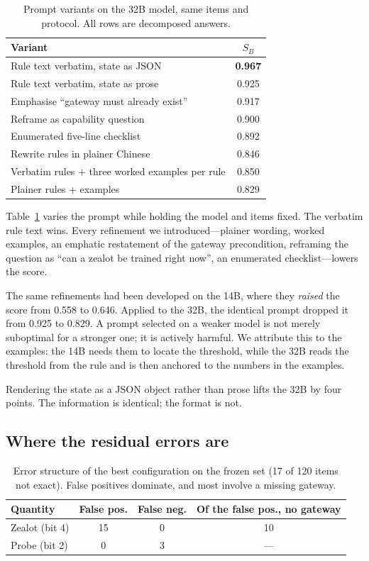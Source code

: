 \documentclass[journal]{IEEEtran}
\newcommand{\sB}{S_B}
\begin{document}
\begin{table}[t]
\centering
\caption{Prompt variants on the 32B model, same items and protocol. All rows are decomposed
answers.}
\label{tab:variants}
\footnotesize
\begin{tabular}{@{}lc@{}}
\toprule
Variant & $\sB$ \\
\midrule
Rule text verbatim, state as JSON & \textbf{0.967} \\
Rule text verbatim, state as prose & 0.925 \\
Emphasise ``gateway must already exist'' & 0.917 \\
Reframe as capability question & 0.900 \\
Enumerated five-line checklist & 0.892 \\
Rewrite rules in plainer Chinese & 0.846 \\
Verbatim rules + three worked examples per rule & 0.850 \\
Plainer rules + examples & 0.829 \\
\bottomrule
\end{tabular}
\end{table}

Table~\ref{tab:variants} varies the prompt while holding the model and items fixed. The
verbatim rule text wins. Every refinement we introduced---plainer wording, worked examples, an
emphatic restatement of the gateway precondition, reframing the question as ``can a zealot be
trained right now'', an enumerated checklist---lowers the score.

The same refinements had been developed on the 14B, where they \emph{raised} the score from
0.558 to 0.646. Applied to the 32B, the identical prompt dropped it from 0.925 to 0.829. A
prompt selected on a weaker model is not merely suboptimal for a stronger one; it is actively
harmful. We attribute this to the examples: the 14B needs them to locate the threshold, while
the 32B reads the threshold from the rule and is then anchored to the numbers in the examples.

Rendering the state as a JSON object rather than prose lifts the 32B by four points. The
information is identical; the format is not.

\subsection{Where the residual errors are}

\begin{table}[t]
\centering
\caption{Error structure of the best configuration on the frozen set (17 of 120 items not
exact). False positives dominate, and most involve a missing gateway.}
\label{tab:errors}
\footnotesize
\begin{tabular}{@{}lccc@{}}
\toprule
Quantity & False pos. & False neg. & Of the false pos., no gateway \\
\midrule
Zealot (bit 4) & 15 & 0 & 10 \\
Probe (bit 2)  & 0  & 3 & --- \\
\bottomrule
\end{tabular}
\end{table}
\end{document}
